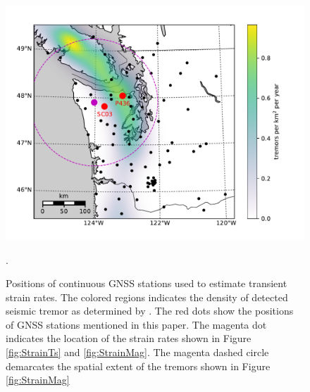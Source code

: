 \documentclass[10pt,letter]{article}
\begin{document}
\begin{figure}
\includegraphics{figures/context_map/context-map.pdf}
\caption{Positions of continuous GNSS stations used to estimate transient strain rates. The colored regions indicates the density of detected seismic tremor as determined by \citet{Wech2010}. The red dots show the positions of GNSS stations mentioned in this paper. The magenta dot indicates the location of the strain rates shown in Figure \ref{fig:StrainTs} and \ref{fig:StrainMag}. The magenta dashed circle demarcates the spatial extent of the tremors shown in Figure \ref{fig:StrainMag}}.    
\label{fig:Context}
\end{figure}
\end{document}
